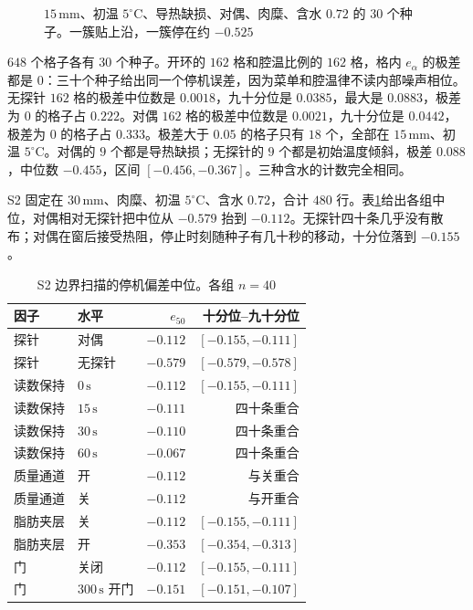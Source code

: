 \begin{figure}[htbp]
\centering
{}
\caption{\(15\,\mathrm{mm}\)、初温 \(5^\circ\mathrm{C}\)、导热缺损、对偶、肉糜、含水 \(0.72\) 的 \(30\) 个种子。一簇贴上沿，一簇停在约 \(-0.525\)}
\label{fig:pseedc}
\end{figure}

\(648\) 个格子各有 \(30\) 个种子。开环的 \(162\) 格和腔温比例的 \(162\) 格，格内 \(e_{\alpha}\) 的极差都是 \(0\)：三十个种子给出同一个停机误差，因为菜单和腔温律不读内部噪声相位。无探针 \(162\) 格的极差中位数是 \(0.0018\)，九十分位是 \(0.0385\)，最大是 \(0.0883\)，极差为 \(0\) 的格子占 \(0.222\)。对偶 \(162\) 格的极差中位数是 \(0.0021\)，九十分位是 \(0.0442\)，极差为 \(0\) 的格子占 \(0.333\)。极差大于 \(0.05\) 的格子只有 \(18\) 个，全部在 \(15\,\mathrm{mm}\)、初温 \(5^\circ\mathrm{C}\)。对偶的 \(9\) 个都是导热缺损；无探针的 \(9\) 个都是初始温度倾斜，极差 \(0.088\)，中位数 \(-0.455\)，区间 \([-0.456,-0.367]\)。三种含水的计数完全相同。

S2 固定在 \(30\,\mathrm{mm}\)、肉糜、初温 \(5^\circ\mathrm{C}\)、含水 \(0.72\)，合计 \(480\) 行。表\ref{tab:s2}{}给出各组中位，对偶相对无探针把中位从 \(-0.579\) 抬到 \(-0.112\)。无探针四十条几乎没有散布；对偶在窗后接受热阻，停止时刻随种子有几十秒的移动，十分位落到 \(-0.155\)。

\begin{table}[htbp]
\centering
\caption{S2 边界扫描的停机偏差中位。各组 \(n=40\)}
\label{tab:s2}
\setlength{\tabcolsep}{2.2pt}
{\footnotesize
\begin{tabular}{llrr}
\toprule
因子 & 水平 & \(e_{50}\) & 十分位--九十分位 \\
\midrule
探针 & 对偶 & \(-0.112\) & \([-0.155,-0.111]\) \\
探针 & 无探针 & \(-0.579\) & \([-0.579,-0.578]\) \\
读数保持 & \(0\,\mathrm{s}\) & \(-0.112\) & \([-0.155,-0.111]\) \\
读数保持 & \(15\,\mathrm{s}\) & \(-0.111\) & 四十条重合 \\
读数保持 & \(30\,\mathrm{s}\) & \(-0.110\) & 四十条重合 \\
读数保持 & \(60\,\mathrm{s}\) & \(-0.067\) & 四十条重合 \\
质量通道 & 开 & \(-0.112\) & 与关重合 \\
质量通道 & 关 & \(-0.112\) & 与开重合 \\
脂肪夹层 & 关 & \(-0.112\) & \([-0.155,-0.111]\) \\
脂肪夹层 & 开 & \(-0.353\) & \([-0.354,-0.313]\) \\
门 & 关闭 & \(-0.112\) & \([-0.155,-0.111]\) \\
门 & \(300\,\mathrm{s}\) 开门 & \(-0.151\) & \([-0.151,-0.107]\) \\
\bottomrule
\end{tabular}}
\end{table}

